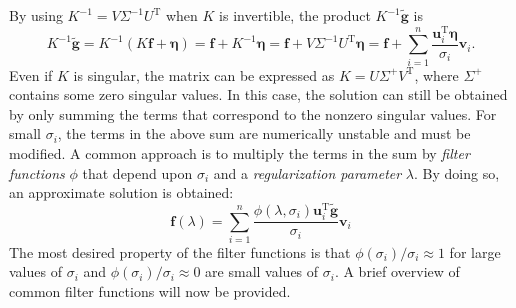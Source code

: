 \documentclass[12pt]{article}
\newcommand{\gnoise}{\widetilde{\mathbf{g}}}
\newcommand{\kmat}{K}	%
\newcommand{\fdis}{\mathbf{f}}
\newcommand{\trans}{\mathrm{T}}	%
\newcommand{\regparam}{\lambda}
\newcommand{\filt}{\phi}
\newcommand{\noise}{\bm{\eta}}	%
\newcommand{\singular}{\sigma}	%
\newcommand{\LSV}{\mathbf{u}}	%
\newcommand{\RSV}{\mathbf{v}}	%
\begin{document}
By using $\kmat^{-1} = V\Sigma^{-1}U^\trans$ when $\kmat$ is invertible, the product $\kmat^{-1}\gnoise$ is
\begin{equation}
\kmat^{-1}\gnoise = \kmat^{-1}\left(\kmat\fdis + \noise\right) = \fdis + \kmat^{-1}\noise = \fdis + V\Sigma^{-1}{U^\trans}\noise = \fdis + \sum_{i = 1}^n \frac{{\LSV^\trans_i}\noise}{\singular_i}\RSV_i. 
\label{Eq_InvProd}
\end{equation}
Even if $\kmat$ is singular, the matrix can be expressed as $\kmat = U{\Sigma^+}{V^\trans}$, where $\Sigma^+$ contains some zero singular values. In this case, the solution can still be obtained by only summing the terms that correspond to the nonzero singular values. For small $\singular_i$, the terms in the above sum are numerically unstable and must be modified. A common approach is to multiply the terms in the sum by \textit{filter functions} $\filt$ that depend upon $\singular_i$ and a \textit{regularization parameter} $\regparam$. By doing so, an approximate solution is obtained:
\begin{equation}
\fdis(\regparam) = \sum_{i = 1}^n \frac{\filt(\regparam,\singular_i){\LSV^\trans_i}\gnoise}{\singular_i}\RSV_i
\label{Eq_ApproxSol}
\end{equation}
The most desired property of the filter functions is that $\filt(\singular_i)/\singular_i \approx 1$  for large values of $\singular_i$ and $\filt(\singular_i)/\singular_i \approx 0$ are small values of $\singular_i$. A brief overview of common filter functions will now be provided.
\end{document}
